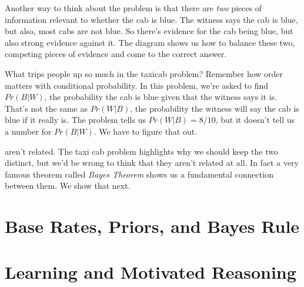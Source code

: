 \documentclass[]{tufte-book}
\begin{document}
Another way to think about the problem is that there are \emph{two} pieces of information relevant to whether the cab is blue. The witness says the cab is blue, but also, most cabs are not blue. So there's evidence for the cab being blue, but also strong evidence against it. The diagram shows us how to balance these two, competing pieces of evidence and come to the correct answer.

What trips people up so much in the taxicab problem? Remember how order matters with conditional probability. In this problem, we're asked to find \(Pr(B | W)\), the probability the cab is blue given that the witness says it is. That's not the same as \(Pr(W | B)\), the probability the witness will say the cab is blue if it really is. The problem tells us \(Pr(W | B) = 8/10\), but it doesn't tell us a number for \(Pr(B | W)\). We have to figure that out.

 aren't related. The taxi cab problem highlights why we should keep the two distinct, but we'd be wrong to think that they aren't related at all. In fact a very famous theorem called \emph{Bayes Theorem} shows us a fundamental connection between them. We show that next.

\hypertarget{base-rates-priors-and-bayes-rule}{%
\chapter{Base Rates, Priors, and Bayes Rule}\label{base-rates-priors-and-bayes-rule}}

\hypertarget{learning-and-motivated-reasoning}{%
\chapter{Learning and Motivated Reasoning}\label{learning-and-motivated-reasoning}}
\end{document}
